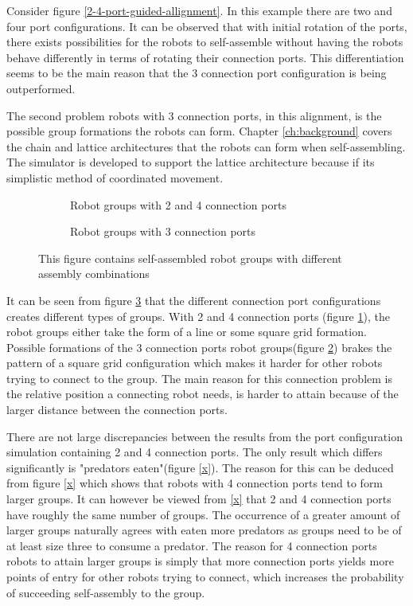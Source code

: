 Consider figure \ref{2-4-port-guided-allignment}.
In this example there are two and four port configurations.
It can be observed that with initial rotation of the ports, there exists possibilities for the robots to self-assemble without having the robots behave differently in terms of rotating their connection ports.
This differentiation seems to be the main reason that the 3 connection port configuration is being outperformed.

The second problem robots with 3 connection ports, in this alignment, is the possible group formations the robots can form.
Chapter \ref{ch:background} covers the chain and lattice architectures that the robots can form when self-assembling. %
The simulator is developed to support the lattice architecture because if its simplistic method of coordinated movement.

\begin{figure}[H]
	\begin{subfigure}[t]{0.49\textwidth}
		\centering
		\caption{Robot groups with 2 and 4 connection ports}
		\label{2-4-port-architecture}
	\end{subfigure}
	\begin{subfigure}[t]{0.49\textwidth}
		\centering
		\caption{Robot groups with 3 connection ports}
		\label{3-port-architecture}
	\end{subfigure}
	\caption{This figure contains self-assembled robot groups with different assembly combinations}
	\label{port-architectures}
\end{figure}

It can be seen from figure \ref{port-architectures} that the different connection port configurations creates different types of groups. 
With 2 and 4 connection ports (figure \ref{2-4-port-architecture}), the robot groups either take the form of a line or some square grid formation.
Possible formations of the 3 connection ports robot groups(figure \ref{3-port-architecture}) brakes the pattern of a square grid configuration which makes it harder for other robots trying to connect to the group.
The main reason for this connection problem is the relative position a connecting robot needs, is harder to attain because of the larger distance between the connection ports.

There are not large discrepancies between the results from the port configuration simulation containing 2 and 4 connection ports.
The only result which differs significantly is "predators eaten"(figure \ref{x}).
The reason for this can be deduced from figure \ref{x} which shows that robots with 4 connection ports tend to form larger groups.
It can however be viewed from \ref{x} that 2 and 4 connection ports have roughly the same number of groups.
The occurrence of a greater amount of larger groups naturally agrees with eaten more predators as groups need to be of at least size three to consume a predator.
The reason for 4 connection ports robots to attain larger groups is simply that more connection ports yields more points of entry for other robots trying to connect, which increases the probability of succeeding self-assembly to the group.

